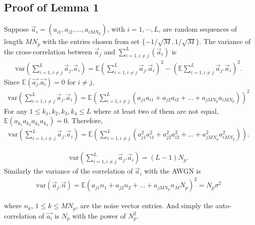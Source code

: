 \documentclass[journal,onecolumn,12pt]{IEEEtran}
\begin{document}
 \begin{appendices}
	
\section{Proof of Lemma 1}\label{Ap:Cor}

Suppose $\vec{a}_i=(a_{i1}, a_{i2}, \dots, a_{iMN_p})$, with $i=1,\cdots,L$, are random sequences of length $MN_p$ with the entries chosen from set $\{-1/\sqrt{M}, 1/\sqrt{M}\}$. The variance of the cross-correlation between $\vec{a}_j$ and $\sum_{i=1,i \neq j}^{L} (\vec{a}_i)$ is 
\begin{align}
	\text{var}\left(\sum_{i=1,i \neq j}^{L} \vec{a}_j.\vec{a}_i\right) = \mathbb{E}\left(\sum_{i=1,i \neq j}^{L} \vec{a}_j.\vec{a}_i\right)^2 - \left(\mathbb{E}\sum_{i=1,i \neq j}^{L} \vec{a}_j.\vec{a}_i\right)^2. \label{eq:var_cross}
	\end{align}
	Since $\mathbb{E}(\vec{a_j}.\vec{a_i})=0$ for $i \neq j$, 
	\begin{align}
	\text{var}\left(\sum_{i=1,i \neq j}^{L} \vec{a}_j.\vec{a}_i\right) = \mathbb{E}\left(\sum_{i=1,i \neq j}^{L}
	(a_{j1}a_{i1}+a_{j2}a_{i2}+\dots+a_{jMN_p}a_{iMN_p}) \right)^2 
	\end{align}
	For any $1\leq k_1,k_2,k_3,k_4 \leq L$ where at least two of them are not equal, $\mathbb{E}(a_{k_1}a_{k_2}a_{k_3}a_{k_4})=0$. Therefore,
	\begin{align}
	\text{var}\left(\sum_{i=1,i \neq j}^{L} \vec{a}_j.\vec{a}_i\right) =
	\mathbb{E}\left(\sum_{i=1,i \neq j}^{L}
	(a_{j1}^2a_{i1}^2+a_{j2}^2a_{i2}^2+\dots+a_{jMN_p}^2a_{iMN_p}^2) \right).
	\end{align}
	
	\begin{align}
	\text{var}\left(\sum_{i=1,i \neq j}^{L} \vec{a}_j.\vec{a}_i\right) = (L-1)N_p.
	\end{align}
	Similarly the variance of the correlation of $\vec{a}_i$ with the AWGN is
	\begin{align}
	\text{var}(\vec{a}_j.\vec{n}) = \mathbb{E} (a_{j1}n_1+a_{j2}n_2+\dots+a_{jMN_p}n_MN_p)^2=N_p\sigma^2
	\end{align}
	
	where $n_k$, $1 \leq k \leq MN_p$, are the noise vector entries. And simply the auto-correlation of $\vec{a_i}$ is $N_p$ with the power of $N_p^2$.


\end{appendices}
\end{document}
